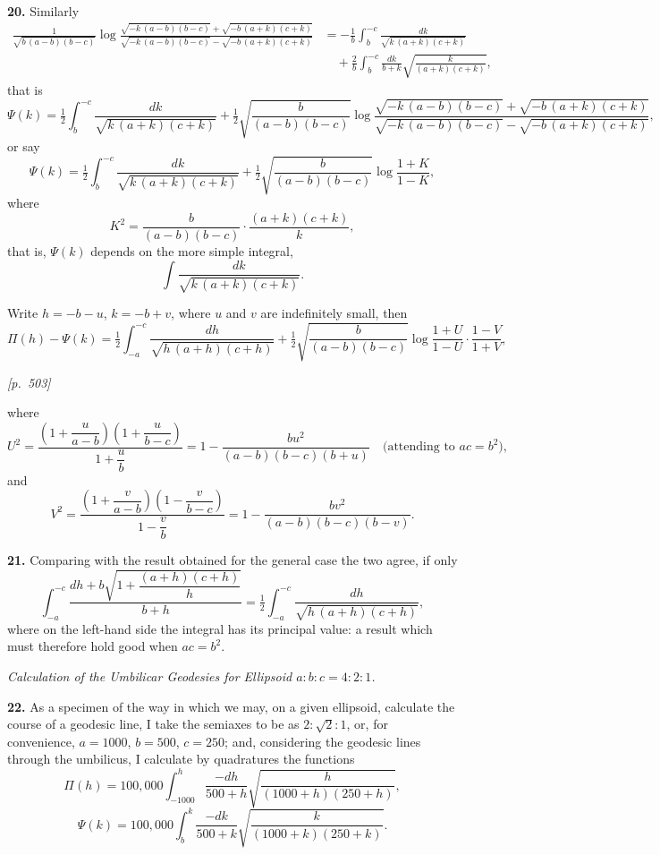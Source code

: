 \documentclass[11pt]{article}
\begin{document}
\textbf{20.} Similarly
\begin{align*}
\frac{1}{\sqrt{b\,(a-b)(b-c)}}\log
\frac{\sqrt{-k\,(a-b)(b-c)}+\sqrt{-b\,(a+k)(c+k)}}
{\sqrt{-k\,(a-b)(b-c)}-\sqrt{-b\,(a+k)(c+k)}}
&= -\frac{1}{b}\int_{b}^{-c}\frac{dk}{\sqrt{k\,(a+k)(c+k)}}\\
&\quad +\frac{2}{b}\int_{b}^{-c}\frac{dk}{b+k}\sqrt{\frac{k}{(a+k)(c+k)}},
\end{align*}
that is
\[
\Psi(k)=\tfrac{1}{2}\int_{b}^{-c}\frac{dk}{\sqrt{k\,(a+k)(c+k)}}
+\tfrac{1}{2}\sqrt{\frac{b}{(a-b)(b-c)}}
\log\frac{\sqrt{-k\,(a-b)(b-c)}+\sqrt{-b\,(a+k)(c+k)}}
{\sqrt{-k\,(a-b)(b-c)}-\sqrt{-b\,(a+k)(c+k)}},
\]
or say
\[
\Psi(k)=\tfrac{1}{2}\int_{b}^{-c}\frac{dk}{\sqrt{k\,(a+k)(c+k)}}
+\tfrac{1}{2}\sqrt{\frac{b}{(a-b)(b-c)}}\log\frac{1+K}{1-K},
\]
where
\[
K^{2}=\frac{b}{(a-b)(b-c)}\cdot\frac{(a+k)(c+k)}{k},
\]
that is, $\Psi(k)$ depends on the more simple integral,
\[
\int\frac{dk}{\sqrt{k\,(a+k)(c+k)}}.
\]

Write $h=-b-u$, $k=-b+v$, where $u$ and $v$ are indefinitely small, then
\[
\Pi(h)-\Psi(k)=\tfrac{1}{2}\int_{-a}^{-c}\frac{dh}{\sqrt{h\,(a+h)(c+h)}}
+\tfrac{1}{2}\sqrt{\frac{b}{(a-b)(b-c)}}\log\frac{1+U}{1-U}\cdot\frac{1-V}{1+V},
\]

\medskip

\noindent\textit{[p.~503]}

\medskip

\noindent
where
\[
U^{2}=\frac{\left(1+\dfrac{u}{a-b}\right)\!\left(1+\dfrac{u}{b-c}\right)}
{1+\dfrac{u}{b}}
=1-\frac{bu^{2}}{(a-b)(b-c)(b+u)}\quad\text{(attending to }ac=b^{2}\text{),}
\]
and
\[
V^{2}=\frac{\left(1+\dfrac{v}{a-b}\right)\!\left(1-\dfrac{v}{b-c}\right)}
{1-\dfrac{v}{b}}
=1-\frac{bv^{2}}{(a-b)(b-c)(b-v)}.
\]

\textbf{21.} Comparing with the result obtained for the general case the
two agree, if only
\[
\int_{-a}^{-c}\frac{dh+b\sqrt{1+\dfrac{(a+h)(c+h)}{h}}}{b+h}
=\tfrac{1}{2}\int_{-a}^{-c}\frac{dh}{\sqrt{h\,(a+h)(c+h)}},
\]
where on the left-hand side the integral has its principal value: a
result which must therefore hold good when $ac=b^{2}$.

\medskip

\begin{center}\textit{Calculation of the Umbilicar Geodesies for Ellipsoid
$a:b:c=4:2:1$.}\end{center}

\medskip

\textbf{22.} As a specimen of the way in which we may, on a given
ellipsoid, calculate the course of a geodesic line, I take the semiaxes
to be as $2:\sqrt{2}:1$, or, for convenience, $a=1000$, $b=500$,
$c=250$; and, considering the geodesic lines through the umbilicus, I
calculate by quadratures the functions
\[
\Pi(h)=100{,}000\int_{-1000}^{h}\frac{-dh}{500+h}\sqrt{\frac{h}{(1000+h)(250+h)}},
\]
\[
\Psi(k)=100{,}000\int_{b}^{k}\frac{-dk}{500+k}\sqrt{\frac{k}{(1000+k)(250+k)}}.
\]
\end{document}
